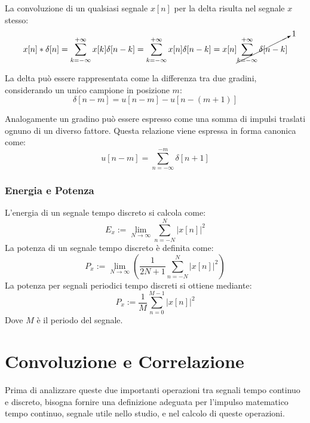 \documentclass{article}
\numberwithin{equation}{subsection}
\begin{document}
La convoluzione di un qualsiasi segnale $x[n]$ per la delta risulta nel segnale $x$ stesso:
\begin{equation*}
    x[n]*\delta[n]=\displaystyle\sum_{k=-\infty}^{+\infty}x[k]\delta[n-k]=\sum_{k=-\infty}^{+\infty}x[n]\delta[n-k]=x[n]\cancelto{1}{\sum_{k=-\infty}^{+\infty}\delta[n-k]}
\end{equation*}


La delta può essere rappresentata come la differenza tra due gradini, considerando un unico campione in posizione $m$:
\begin{equation*}
    \delta[n-m]=u[n-m]-u[n-(m+1)]
\end{equation*}


Analogamente un gradino può essere espresso come una somma di impulsi traslati ognuno di un diverso fattore. Questa relazione viene espressa in forma canonica come:
\begin{equation*}
    u[n-m]=\displaystyle\sum_{n=-\infty}^{-m}\delta[n+1]
\end{equation*}

\subsubsection{Energia e Potenza}

L'energia di un segnale tempo discreto si calcola come:
\begin{equation*}
    E_x:=\displaystyle\lim_{N\to\infty}\sum_{n=-N}^N|x[n]|^2
\end{equation*}
La potenza di un segnale tempo discreto è definita come:
\begin{equation*}
    P_x:=\displaystyle\lim_{N\to\infty}\left(\frac{1}{2N+1}\sum_{n=-N}^N|x[n]|^2\right)
\end{equation*}
La potenza per segnali periodici tempo discreti si ottiene mediante:
\begin{equation*}
    P_x:=\displaystyle\frac{1}{M}\sum_{n=0}^{M-1}|x[n]|^2
\end{equation*}
Dove $M$ è il periodo del segnale.

\clearpage

\section{Convoluzione e Correlazione}

Prima di analizzare queste due importanti operazioni tra segnali tempo continuo e discreto, bisogna fornire una definizione adeguata per l'impulso matematico tempo 
continuo, segnale utile nello studio, e nel calcolo di queste operazioni.  
\end{document}
